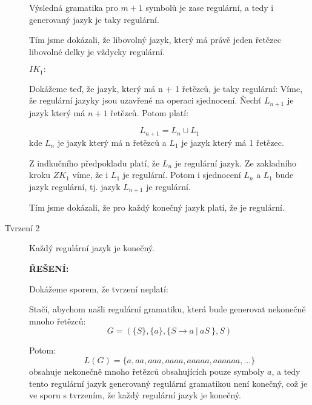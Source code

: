 \documentclass[10pt]{article}
\begin{document}
\begin{description}
        Výsledná gramatika pro $m+1$ symbolů je zase regulární, a tedy i generovaný jazyk je taky regulární.
        
        Tím jsme dokázali, že libovolný jazyk, který má právě jeden řetězec libovolné delky je vždycky regulární.

        $IK_1:$
        
        Dokážeme teď, že jazyk, který má n + 1 řetězců, je taky regulární:
        Víme, že regulární jazyky jsou uzavřené na operaci sjednocení. Ňechť $L_{n+1}$ je jazyk který má $n+1$ řetězců. Potom platí:

        $$L_{n+1} = L_{n} \cup L_{1}$$ kde $L_{n}$ je jazyk který má n řetězců a $L_{1}$ je jazyk který má 1 řetězec.
        
        Z indkučního předpokladu platí, že $L_{n}$ je regulární jazyk. Ze zakladního kroku $ZK_1$ víme, že i $L_1$ je regulární. Potom i sjednocení $L_n$ a $L_1$ bude jazyk regulární, tj. jazyk $L_{n+1}$ je regulární.

        Tím jsme dokázali, že pro každý konečný jazyk platí, že je regulární.
        
        
    \item[Tvrzení 2] Každý regulární jazyk je konečný.    
    
        \textbf{ŘEŠENÍ:} 

            Dokážeme sporem, že tvrzení neplatí:

            Stačí, abychom našli regulární gramatiku, která bude generovat nekonečně mnoho řetězců:
            $$G = ( \{S\}, \{a\}, \{ S \rightarrow a\ |\ aS\  \}, S ) $$

            Potom:
            $$L(G) = \{a, aa, aaa, aaaa, aaaaa, aaaaaa, ...\}$$ obsahuje nekonečně mnoho řetězců obsahujících pouze symboly $a$, a tedy tento regulární jazyk generovaný regulární gramatikou není konečný, což je ve sporu s tvrzením, že každý regulární jazyk je konečný.
    
\end{description}
\end{document}
